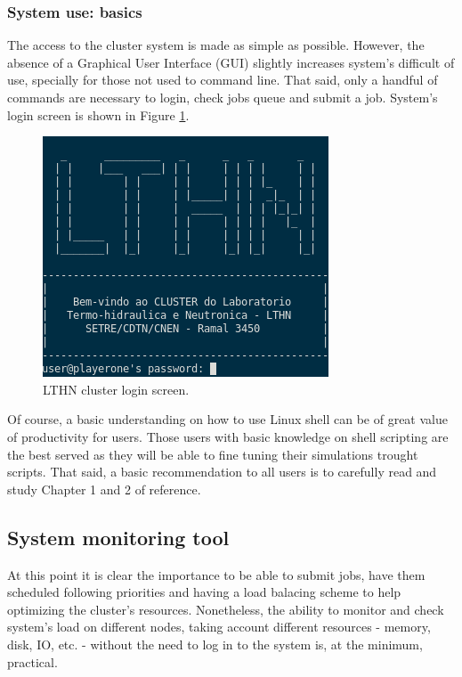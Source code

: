 \documentclass[twoside,a4paper,12pt,english]{inac19}
\begin{document}
\subsubsection{System use: basics}
The access to the cluster system is made as simple as possible. However, the absence of a Graphical User Interface
(GUI) slightly increases system's difficult of use, specially for those not used to command line. That said, only
a handful of commands are necessary to login, check jobs queue and submit a job. System's login screen is shown
in Figure \ref{fig:login-screen}.

\begin{figure}[h] %
  \centering\includegraphics[scale=0.7]{images/p1login.png}
  \caption{LTHN cluster login screen.}
  \label{fig:login-screen}
\end{figure}

Of course, a basic understanding on how to use Linux shell can be of great value of productivity for users.
Those users with basic knowledge on shell scripting are the best served as they will be able to fine tuning
their simulations trought scripts. That said, a basic recommendation to all users is to carefully read and
study Chapter 1 and 2 of reference\cite{ECP}.

\subsection{System monitoring tool}
\label{ssec:ganglia}

At this point it is clear the importance to be able to submit jobs, have them scheduled following priorities
and having a load balacing scheme to help optimizing the cluster's resources. Nonetheless, the ability to
monitor and check system's load on different nodes, taking account different resources - memory, disk, IO,
etc. - without the need to log in to the system is, at the minimum, practical.
\end{document}
